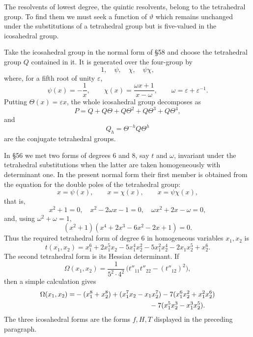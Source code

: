 \documentclass[12pt,a4paper]{article}
\newcommand{\omegaT}{\Omega}
\begin{document}
The resolvents of lowest degree, the quintic resolvents, belong to the tetrahedral group.  To find them we must seek a function of $\vartheta$ which remains unchanged under the substitutions of a tetrahedral group but is five-valued in the icosahedral group.

Take the icosahedral group in the normal form of \S 58 and choose the tetrahedral group $Q$ contained in it.  It is generated over the four-group by
\begin{equation}
 1,\quad \psi,\quad \chi,\quad \psi\chi,
\end{equation}
where, for a fifth root of unity $\varepsilon$,
\begin{equation}
 \psi(x)=-\frac1x,
 \qquad
 \chi(x)=\frac{\omega x+1}{x-\omega},
 \qquad
 \omega=\varepsilon+\varepsilon^{-1}.
\end{equation}
Putting $\Theta(x)=\varepsilon x$, the whole icosahedral group decomposes as
\begin{equation}
 P=Q+Q\Theta+Q\Theta^2+Q\Theta^3+Q\Theta^4,
\end{equation}
and
\begin{equation}
 Q_h=\Theta^{-h}Q\Theta^h
\end{equation}
are the conjugate tetrahedral groups.

In \S 56 we met two forms of degrees $6$ and $8$, say $t$ and $\omega$, invariant under the tetrahedral substitutions when the latter are taken homogeneously with determinant one.  In the present normal form their first member is obtained from the equation for the double poles of the tetrahedral group:
\[
 x=\psi(x),\qquad x=\chi(x),\qquad x=\psi\chi(x),
\]
that is,
\[
 x^2+1=0,
 \quad x^2-2\omega x-1=0,
 \quad \omega x^2+2x-
\omega=0,
\]
and, using $\omega^2+\omega=1$,
\begin{equation}
 (x^2+1)(x^4+2x^3-6x^2-2x+1)=0.
\end{equation}
Thus the required tetrahedral form of degree $6$ in homogeneous variables $x_1,x_2$ is
\begin{equation}
 t(x_1,x_2)=x_1^6+2x_1^5x_2-5x_1^4x_2^2-5x_1^2x_2^4-2x_1x_2^5+x_2^6.
\end{equation}
The second tetrahedral form is its Hessian determinant.  If
\begin{equation}
 \omegaT(x_1,x_2)=\frac{1}{5^2\cdot4^2}
 \,\bigl(t''_{11}t''_{22}-(t''_{12})^2\bigr),
\end{equation}
then a simple calculation gives
\begin{align}
 \omegaT(x_1,x_2)=&-(x_1^8+x_2^8)+(x_1^7x_2-x_1x_2^7)
      -7(x_1^6x_2^2+x_1^2x_2^6)\notag\\
 &\hspace{1.5in}-7(x_1^5x_2^3-x_1^3x_2^5).
\end{align}
The three icosahedral forms are the forms $f,H,T$ displayed in the preceding paragraph.
\end{document}
